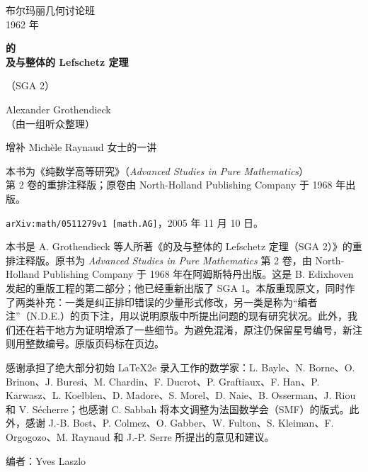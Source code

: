 \begin{center}
布尔玛丽几何讨论班\\
1962 年

\bigskip
{\Large\bfseries {}的\\及与整体的 Lefschetz 定理}

\medskip
（SGA 2）

\bigskip
Alexander Grothendieck\\
（由一组听众整理）

\medskip
增补 Michèle Raynaud 女士的一讲

\bigskip
本书为《纯数学高等研究》（\textit{Advanced Studies in Pure Mathematics}）\\
第 2 卷的重排注释版；原卷由 North-Holland Publishing Company 于 1968 年出版。

\medskip
\texttt{arXiv:math/0511279v1 [math.AG]}，2005 年 11 月 10 日。
\end{center}

本书是 A. Grothendieck 等人所著《的及与整体的 Lefschetz 定理（SGA 2）》的重排注释版。原书为 \textit{Advanced Studies in Pure Mathematics} 第 2 卷，由 North-Holland Publishing Company 于 1968 年在阿姆斯特丹出版。这是 B. Edixhoven 发起的重版工程的第二部分；他已经重新出版了 SGA 1。本版重现原文，同时作了两类补充：一类是纠正排印错误的少量形式修改，另一类是称为“编者注”（N.D.E.）的页下注，用以说明原版中所提出问题的现有研究状况。此外，我们还在若干地方为证明增添了一些细节。为避免混淆，原注仍保留星号编号，新注则用整数编号。原版页码标在页边。

感谢承担了绝大部分初始 \LaTeX2e{} 录入工作的数学家：L. Bayle、N. Borne、O. Brinon、J. Buresi、M. Chardin、F. Ducrot、P. Graftiaux、F. Han、P. Karwasz、L. Koelblen、D. Madore、S. Morel、D. Naie、B. Osserman、J. Riou 和 V. Sécherre；也感谢 C. Sabbah 将本文调整为法国数学会（SMF）的版式。此外，感谢 J.-B. Bost、P. Colmez、O. Gabber、W. Fulton、S. Kleiman、F. Orgogozo、M. Raynaud 和 J.-P. Serre 所提出的意见和建议。

\begin{flushright}编者：Yves Laszlo\end{flushright}

